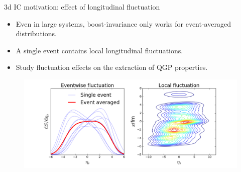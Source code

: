 \documentclass[11pt]{beamer}
\begin{document}
\begin{frame}{3d IC motivation: effect of longitudinal fluctuation}
\begin{itemize}
\item Even in large systems, boost-invariance only works for event-averaged distributions.
\item A single event contains local longitudinal fluctuations.
\item Study fluctuation effects on the extraction of QGP properties.
\end{itemize}
\begin{center}
\begin{figure}
\includegraphics[width=\textwidth]{./pics/fluct-AA.png}
\end{figure}
\end{center}
\end{frame}
\end{document}
